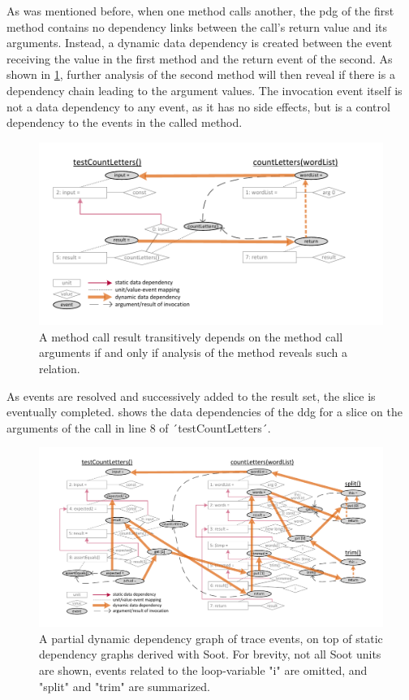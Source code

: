 As was mentioned before, when one method calls another, the \ac{pdg} of the first method contains no dependency links between the call's return value and its arguments.
Instead, a dynamic data dependency is created between the event receiving the value in the first method and the return event of the second.
As shown in \cref{fig:graph_dynamic_method}, further analysis of the second method will then reveal if there is a dependency chain leading to the argument values.
The invocation event itself is not a data dependency to any event, as it has no side effects, but is a control dependency to the events in the called method.

\begin{figure}[tp]
\centering
\includegraphics[width=.8\linewidth, clip, trim=6mm 7mm 16mm 7mm]{img/graph_dynamic_method}
\caption[Dynamic dependencies of a method call]{A method call result transitively depends on the method call arguments if and only if analysis of the method reveals such a relation.}
\label{fig:graph_dynamic_method}
\end{figure}

As events are resolved and successively added to the result set, the slice is eventually completed.
 shows the data dependencies of the \ac{ddg} for a slice on the arguments of the call in line 8 of ´testCountLetters´.

\begin{figure}[tp]
\centering
\includegraphics[width=\linewidth, clip, trim=11mm 7mm 8mm 7mm]{img/graph_dynamic2}
\caption[A partial dynamic dependency graph of trace events]{A partial dynamic dependency graph of trace events, on top of static dependency graphs derived with Soot. For brevity, not all Soot units are shown, events related to the loop-variable "i" are omitted, and "split" and "trim" are summarized.}
\label{fig:graph_dynamic}
\end{figure}

